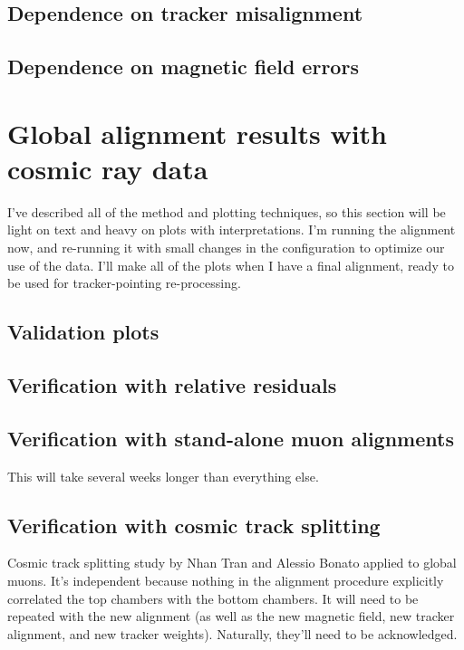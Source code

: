 \documentclass[12pt]{article}
\begin{document}
\subsection{Dependence on tracker misalignment}

\subsection{Dependence on magnetic field errors}

\section{Global alignment results with cosmic ray data}
\label{sec:craft}

I've described all of the method and plotting techniques, so this
section will be light on text and heavy on plots with interpretations.
I'm running the alignment now, and re-running it with small changes in
the configuration to optimize our use of the data.  I'll make all of
the plots when I have a final alignment, ready to be used for
tracker-pointing re-processing.

\subsection{Validation plots}

\subsection{Verification with relative residuals}

\subsection{Verification with stand-alone muon alignments}

This will take several weeks longer than everything else.

\subsection{Verification with cosmic track splitting}

Cosmic track splitting study by Nhan Tran and Alessio Bonato applied
to global muons.  It's independent because nothing in the alignment
procedure explicitly correlated the top chambers with the bottom
chambers.  It will need to be repeated with the new alignment (as well
as the new magnetic field, new tracker alignment, and new tracker
weights).  Naturally, they'll need to be acknowledged.
\end{document}
